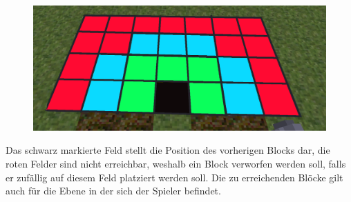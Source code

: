 \begin{figure}
\centering
\includegraphics[scale=0.25]{src/lava_runner/res/1layer.png}
\end{figure}
	Das schwarz markierte Feld stellt die Position des vorherigen Blocks dar, die roten Felder sind nicht erreichbar, weshalb ein Block verworfen werden soll, falls er zufällig auf diesem Feld platziert werden soll. Die zu erreichenden Blöcke gilt auch für die Ebene in der sich der Spieler befindet.